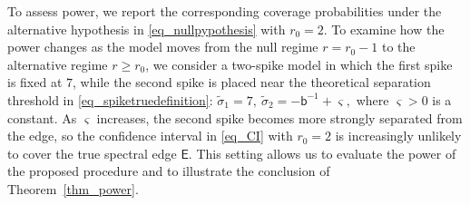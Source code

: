 \documentclass[12pt]{article}
\theoremstyle{plain}
\numberwithin{equation}{section}
\begin{document}
To assess power, we report the corresponding coverage probabilities under the alternative hypothesis in \eqref{eq_nullpypothesis} with $r_0=2$. To examine how the power changes as the model moves from the null regime $r=r_0-1$ to the alternative regime $r \geq r_0$, we consider a two-spike model in which the first spike is fixed at $7$, while the second spike is placed near the theoretical separation threshold in \eqref{eq_spiketruedefinition}: $ \widetilde{\sigma}_1=7, \ \widetilde{\sigma}_2=-\mathsf{b}^{-1}+\varsigma,$ where $\varsigma>0$ is a constant. As $\varsigma$ increases, the second spike becomes more strongly separated from the edge, so the confidence interval in \eqref{eq_CI} with $r_0=2$ is increasingly unlikely to cover the true spectral edge $\mathsf E$. This setting allows us to evaluate the power of the proposed procedure and to illustrate the conclusion of Theorem~\ref{thm_power}. 

\end{document}
